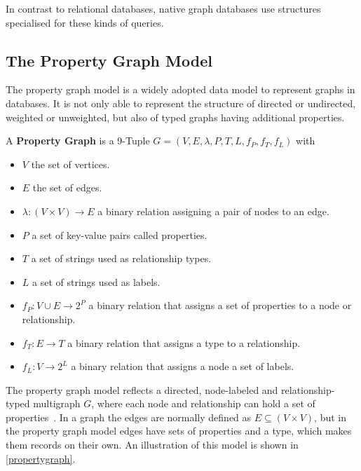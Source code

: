     In contrast to relational databases, native graph databases use structures specialised for these kinds of queries.
            
    \subsection{The Property Graph Model}\label{prop-graph-model}
        The property graph model is a widely adopted data model to represent graphs in databases.
        It is not only able to represent the structure of directed or undirected, weighted or unweighted, but also of typed graphs having additional properties.

        A \textbf{Property Graph} is a 9-Tuple $G = (V, E, \lambda, P, T, L, f_P, f_T, f_L)$ with 
        \begin{itemize}
            \item $V$ the set of vertices.
            \item $E$ the set of edges.
            \item $\lambda: (V \times V) \rightarrow E$ a binary relation assigning a pair of nodes to an edge.
            \item $P$ a set of key-value pairs called properties.
            \item $T$ a set of strings used as relationship types.
            \item $L$ a set of strings used as labels.
            \item $f_P: V \cup E \rightarrow 2^P$ a binary relation that assigns a set of properties to a node or relationship.
            \item $f_T: E \rightarrow T$ a binary relation that assigns a type to a relationship.
            \item  $f_L: V \rightarrow 2^L$ a binary relation that assigns a node a set of labels.
        \end{itemize} 
        \smallskip
        The property graph model reflects a directed, node-labeled and relationship-typed multigraph $G$, where each node and relationship can hold a set of properties~\cite{angles2018property, rodriguez2012graph, Rodriguez2010ConstructionsFD}.
        In a graph the edges are normally defined as $E \subseteq (V \times V)$, but in the property graph model edges have sets of properties and a type, which makes them records on their own. 
        An illustration of this model is shown in \ref{propertygraph}.
        
